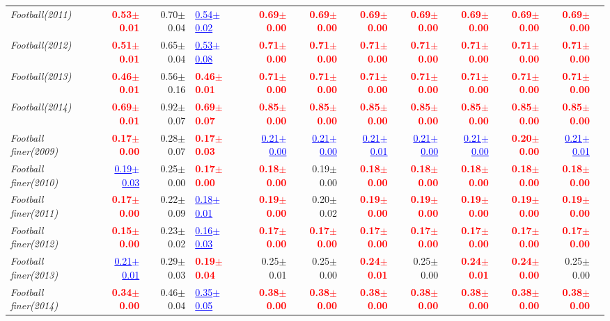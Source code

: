 \documentclass[nohyperref]{article}
\theoremstyle{plain}
\theoremstyle{definition}
\theoremstyle{remark}
\newcommand{\red}[1]{\textcolor{red}{\textbf{#1}}}
\newcommand{\blue}[1]{\textcolor{blue}{\underline{#1}}}
\begin{document}
\begin{table*}[tb!]
{\begin{tabular}{l|rr p{5em}| rrrrrrrr}
			{\it Football(2011)} & \red{0.53$\pm$0.01} & 0.70$\pm$0.04 & \blue{0.54$\pm$0.02} & \red{0.69$\pm$0.00} & \red{0.69$\pm$0.00} & \red{0.69$\pm$0.00} & \red{0.69$\pm$0.00} & \red{0.69$\pm$0.00} & \red{0.69$\pm$0.00} & \red{0.69$\pm$0.00} \\
			{\it Football(2012)} & \red{0.51$\pm$0.01} & 0.65$\pm$0.04 & \blue{0.53$\pm$0.08} & \red{0.71$\pm$0.00} & \red{0.71$\pm$0.00} & \red{0.71$\pm$0.00} & \red{0.71$\pm$0.00} & \red{0.71$\pm$0.00} & \red{0.71$\pm$0.00} & \red{0.71$\pm$0.00} \\
			{\it Football(2013)} & \red{0.46$\pm$0.01} & 0.56$\pm$0.16 & \red{0.46$\pm$0.01} & \red{0.71$\pm$0.00} & \red{0.71$\pm$0.00} & \red{0.71$\pm$0.00} & \red{0.71$\pm$0.00} & \red{0.71$\pm$0.00} & \red{0.71$\pm$0.00} & \red{0.71$\pm$0.00} \\
			{\it Football(2014)} & \red{0.69$\pm$0.01} & 0.92$\pm$0.07 & \red{0.69$\pm$0.07} & \red{0.85$\pm$0.00} & \red{0.85$\pm$0.00} & \red{0.85$\pm$0.00} & \red{0.85$\pm$0.00} & \red{0.85$\pm$0.00} & \red{0.85$\pm$0.00} & \red{0.85$\pm$0.00} \\
			{\it Football finer(2009)} & \red{0.17$\pm$0.00} & 0.28$\pm$0.07 & \red{0.17$\pm$0.03} & \blue{0.21$\pm$0.00} & \blue{0.21$\pm$0.00} & \blue{0.21$\pm$0.01} & \blue{0.21$\pm$0.00} & \blue{0.21$\pm$0.00} & \red{0.20$\pm$0.00} & \blue{0.21$\pm$0.01} \\
			{\it Football finer(2010)} & \blue{0.19$\pm$0.03} & 0.25$\pm$0.00 & \red{0.17$\pm$0.00} & \red{0.18$\pm$0.00} & 0.19$\pm$0.00 & \red{0.18$\pm$0.00} & \red{0.18$\pm$0.00} & \red{0.18$\pm$0.00} & \red{0.18$\pm$0.00} & \red{0.18$\pm$0.00} \\
			{\it Football finer(2011)} & \red{0.17$\pm$0.00} & 0.22$\pm$0.09 & \blue{0.18$\pm$0.01} & \red{0.19$\pm$0.00} & 0.20$\pm$0.02 & \red{0.19$\pm$0.00} & \red{0.19$\pm$0.00} & \red{0.19$\pm$0.00} & \red{0.19$\pm$0.00} & \red{0.19$\pm$0.00} \\
			{\it Football finer(2012)} & \red{0.15$\pm$0.00} & 0.23$\pm$0.02 & \blue{0.16$\pm$0.03} & \red{0.17$\pm$0.00} & \red{0.17$\pm$0.00} & \red{0.17$\pm$0.00} & \red{0.17$\pm$0.00} & \red{0.17$\pm$0.00} & \red{0.17$\pm$0.00} & \red{0.17$\pm$0.00} \\
			{\it Football finer(2013)} & \blue{0.21$\pm$0.01} & 0.29$\pm$0.03 & \red{0.19$\pm$0.04} & 0.25$\pm$0.01 & 0.25$\pm$0.00 & \red{0.24$\pm$0.01} & 0.25$\pm$0.00 & \red{0.24$\pm$0.01} & \red{0.24$\pm$0.00} & 0.25$\pm$0.00 \\
			{\it Football finer(2014)} & \red{0.34$\pm$0.00} & 0.46$\pm$0.04 & \blue{0.35$\pm$0.05} & \red{0.38$\pm$0.00} & \red{0.38$\pm$0.00} & \red{0.38$\pm$0.00} & \red{0.38$\pm$0.00} & \red{0.38$\pm$0.00} & \red{0.38$\pm$0.00} & \red{0.38$\pm$0.00} \\
			\bottomrule
		\end{tabular}}
\end{table*}
\end{document}
